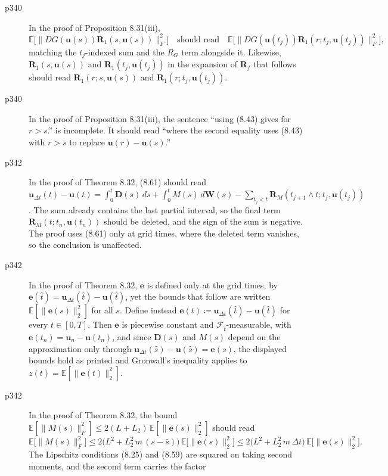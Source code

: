 \documentclass[final]{article}
\theoremstyle{definition}
\newcommand{\vecbs}[1]{\boldsymbol{#1}}
\renewcommand{\vec}[1]{{\vecbs{#1}}}
\begin{document}
\begin{enumerate}
\begin{description}
   \item[p340] In the proof of Proposition 8.31(iii),
\[
\mathbb{E}\bigl[\|DG(\vec{u}(s))\vec{R}_{1}(s,\vec{u}(s))\|_{F}^{2}\bigr]
\quad\text{should read}\quad
\mathbb{E}\bigl[\|DG(\vec{u}(t_{j}))\vec{R}_{1}(r;t_{j},\vec{u}(t_{j}))\|_{F}^{2}\bigr],
\]
matching the $t_{j}$-indexed sum and the $R_{G}$ term alongside it. Likewise,
$\vec R_1(s,\vec u(s))$ and $\vec R_1(t_j,\vec u(t_j))$ in the expansion of
$\vec R_f$ that follows should read $\vec R_1(r;s,\vec u(s))$ and
$\vec R_1(r;t_j,\vec u(t_j))$.
   \item[p340] In the proof of Proposition 8.31(iii), the sentence ``using
(8.43) gives for $r>s$.'' is incomplete. It should read ``where the second
equality uses (8.43) with $r>s$ to replace $\vec{u}(r)-\vec{u}(s)$.''
   \item[p342] In the proof of Theorem 8.32, (8.61) should read
$\vec u_{\Delta t}(t)-\vec u(t)=\int_0^t\vec D(s)\,ds+\int_0^tM(s)\,d\vec W(s)
-\sum_{t_j<t}\vec R_M(t_{j+1}\wedge t;t_j,\vec u(t_j))$. The sum already
contains the last partial interval, so the final term
$\vec R_M(t;t_n,\vec u(t_n))$ should be deleted, and the sign of the sum is
negative. The proof uses (8.61) only at grid times, where the deleted term
vanishes, so the conclusion is unaffected.
   \item[p342] In the proof of Theorem 8.32, $\vec{e}$ is defined only at the
grid times, by $\vec{e}(\hat{t})=\vec{u}_{\Delta t}(\hat{t})-\vec{u}(\hat{t})$,
yet the bounds that follow are written $\mathbb{E}[\|\vec{e}(s)\|_{2}^{2}]$ for
all $s$. Define instead
$\vec{e}(t) \coloneq \vec{u}_{\Delta t}(\hat{t})-\vec{u}(\hat{t})$ for every
$t \in [0,T]$. Then $\vec{e}$ is piecewise constant and
$\mathcal{F}_{\hat{t}}$-measurable, with
$\vec{e}(t_{n})=\vec{u}_{n}-\vec{u}(t_{n})$, and since $\vec{D}(s)$ and $M(s)$
depend on the approximation only through
$\vec{u}_{\Delta t}(\hat{s})-\vec{u}(\hat{s})=\vec{e}(s)$, the displayed bounds
hold as printed and Gronwall's inequality applies to
$z(t)=\mathbb{E}[\|\vec{e}(t)\|_{2}^{2}]$.
   \item[p342] In the proof of Theorem 8.32, the bound
$\mathbb{E}[\|M(s)\|_{F}^{2}] \le 2(L+L_{2})\,\mathbb{E}[\|\vec{e}(s)\|_{2}^{2}]$
should read
\[
\mathbb{E}\bigl[\|M(s)\|_{F}^{2}\bigr]
\le 2\bigl(L^{2}+L_{2}^{2}\,m\,(s-\hat{s})\bigr)\,
\mathbb{E}\bigl[\|\vec{e}(s)\|_{2}^{2}\bigr]
\le 2\bigl(L^{2}+L_{2}^{2}\,m\,\Delta t\bigr)\,
\mathbb{E}\bigl[\|\vec{e}(s)\|_{2}^{2}\bigr].
\]
The Lipschitz conditions (8.25) and (8.59) are squared on taking second moments,
and the second term carries the factor

\end{description}
\end{enumerate}
\end{document}
